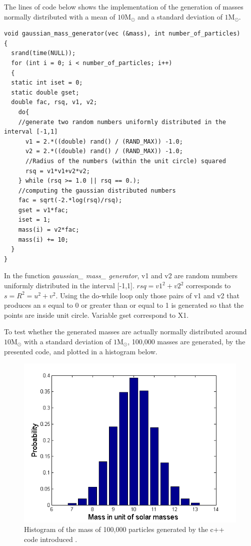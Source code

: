 The lines of code below shows the implementation of the generation of masses normally distributed with a mean of $10\text{M}_{\odot}$ and a standard deviation of $1\text{M}_{\odot}$.
\begin{lstlisting}
void gaussian_mass_generator(vec (&mass), int number_of_particles)
{
  srand(time(NULL));
  for (int i = 0; i < number_of_particles; i++)
  {
  static int iset = 0;
  static double gset;
  double fac, rsq, v1, v2;
    do{
	//generate two random numbers uniformly distributed in the interval [-1,1]   
      v1 = 2.*((double) rand() / (RAND_MAX)) -1.0;
      v2 = 2.*((double) rand() / (RAND_MAX)) -1.0;
      //Radius of the numbers (within the unit circle) squared
      rsq = v1*v1+v2*v2;
    } while (rsq >= 1.0 || rsq == 0.);
    //computing the gaussian distributed numbers
    fac = sqrt(-2.*log(rsq)/rsq);
    gset = v1*fac;
    iset = 1;
    mass(i) = v2*fac;
    mass(i) += 10;
  }
}
\end{lstlisting}
In the function \textit{gaussian\_ mass\_ generator}, v1 and v2 are random numbers uniformly distributed in the interval [-1,1]. $rsq = v1^2 + v2^2$  corresponds to $s = R ^2 = u^2 + v^2$. 
Using the do-while loop only those pairs of v1 and v2 that produces an s equal to 0 or greater than or equal to 1 is generated so that the points are inside unit circle.  Variable gset  correspond to X1.

To test whether the generated masses are actually normally distributed around $10\text{M}_{\odot}$ with a standard deviation of $1\text{M}_{\odot}$, 100,000 masses are generated, by the presented code, and plotted in a histogram below. 
\begin{figure}[H]
\centering
	\includegraphics[width=0.7\linewidth]{Figures/random_mass_test.png}
\caption{
Histogram of the mass of 100,000 particles generated by the c++ code introduced . 
}
\label{fig:GaussianGeneratedMass}
\end{figure}

